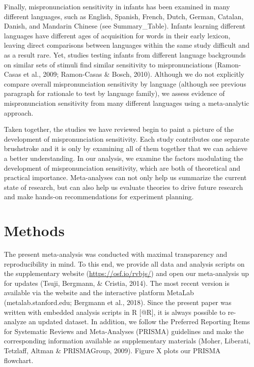 \documentclass[man]{apa6}
\theoremstyle{definition}
\theoremstyle{definition}
\theoremstyle{definition}
\theoremstyle{remark}
\begin{document}
Finally, mispronunciation sensitivity in infants has been examined in
many different languages, such as English, Spanish, French, Dutch,
German, Catalan, Danish, and Mandarin Chinese (see Summary\_Table).
Infants learning different languages have different ages of acquisition
for words in their early lexicon, leaving direct comparisons between
languages within the same study difficult and as a result rare. Yet,
studies testing infants from different language backgrounds on similar
sets of stimuli find similar sensitivity to mispronunciations
(Ramon-Casas et al., 2009; Ramon-Casas \& Bosch, 2010). Although we do
not explicitly compare overall mispronunciation sensitivity by language
(although see previous paragraph for rationale to test by language
family), we assess evidence of mispronunciation sensitivity from many
different languages using a meta-analytic approach.

Taken together, the studies we have reviewed begin to paint a picture of
the development of mispronunciation sensitivity. Each study contributes
one separate brushstroke and it is only by examining all of them
together that we can achieve a better understanding. In our analysis, we
examine the factors modulating the development of mispronunciation
sensitivity, which are both of theoretical and practical importance.
Meta-analyses can not only help us summarize the current state of
research, but can also help us evaluate theories to drive future
research and make hands-on recommendations for experiment planning.

\section{Methods}\label{methods}

The present meta-analysis was conducted with maximal transparency and
reproducibility in mind. To this end, we provide all data and analysis
scripts on the supplementary website (\url{https://osf.io/rvbjs/}) and
open our meta-analysis up for updates (Tsuji, Bergmann, \& Cristia,
2014). The most recent version is available via the website and the
interactive platform MetaLab (metalab.stanford.edu; Bergmann et al.,
2018). Since the present paper was written with embedded analysis
scripts in R {[}@R{]}, it is always possible to re-analyze an updated
dataset. In addition, we follow the Preferred Reporting Items for
Systematic Reviews and Meta-Analyses (PRISMA) guidelines and make the
corresponding information available as supplementary materials (Moher,
Liberati, Tetzlaff, Altman \& PRISMAGroup, 2009). Figure X plots our
PRISMA flowchart.
\end{document}
